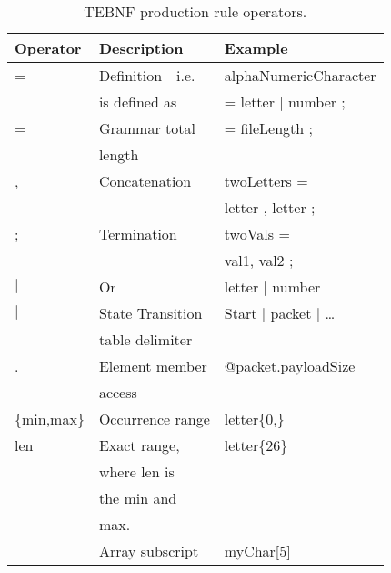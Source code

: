 \begin{table}[h!]
\begin{center}
\caption{TEBNF production rule operators.}
\label{TEBNFProductionRuleOperators}
\begin{tabular}{|l|l|l|} \hline
\textbf{Operator} & \textbf{Description} & \textbf{Example} \\ \hline \hline
=   & Definition$—$i.e. & alphaNumericCharacter \\
    & is defined as     & = letter $|$ number ;  \\ \hline
=   & Grammar total     & = fileLength ; \\
    & length            &                \\ \hline
,   & Concatenation	    & twoLetters =      \\
    &                   & letter , letter ; \\ \hline
;   & Termination       & twoVals =    \\
    &                   & val1, val2 ; \\ \hline
$|$   & Or	            & letter $|$ number \\ \hline
$|$   & State Transition  & Start $|$ packet $|$ … \\
    & table delimiter   &                    \\ \hline
.   & Element member    & @packet.payloadSize \\
    & access            &                     \\ \hline
\{min,max\} & Occurrence range & letter\{0,\} \\ \hline
{len}     & Exact range,  & letter\{26\} \\
          & where len is  &            \\
          & the min and   &            \\
          & max.          &            \\ \hline
[\ ]      & Array subscript	& myChar[5] \\ \hline
\end{tabular}
\end{center}
\end{table}

